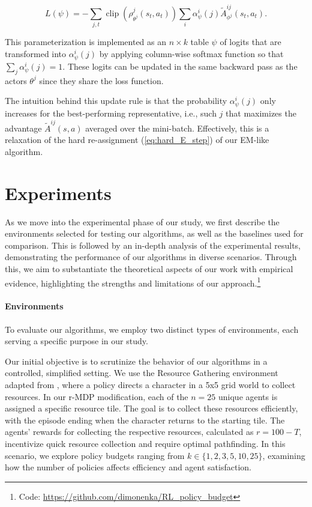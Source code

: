\documentclass[letterpaper]{article} %
\DeclareMathOperator*{\clip}{clip}
\begin{document}
\begin{equation}\label{eq:soft_loss}
    L(\psi) = - \sum_{j, t} \clip(\rho_{\theta^j}^j(s_t, a_t)) \sum_i \alpha_{\psi}^i(j) \tilde{A}_{\phi^j}^{ij}(s_t, a_t).
\end{equation}

This parameterization is implemented as an $n \times k$ table $\psi$ of logits that are transformed into $\alpha_\psi^i(j)$ by applying column-wise softmax function so that $\sum_j \alpha_\psi^i(j) = 1$. These logits can be updated in the same backward pass as the actors $\theta^j$ since they share the loss function.

The intuition behind this update rule is that the probability $\alpha_\psi^i(j)$ only increases for the best-performing representative, i.e., such $j$ that maximizes the advantage $\tilde{A}^{ij}(s, a)$ averaged over the mini-batch. Effectively, this is a relaxation of the hard re-assignment (\ref{eq:hard_E_step}) of our EM-like algorithm.


\section{Experiments}
\label{sec:experiments}

As we move into the experimental phase of our study, we first describe the environments selected for testing our algorithms, as well as the baselines used for comparison. This is followed by an in-depth analysis of the experimental results, demonstrating the performance of our algorithms in diverse scenarios. Through this, we aim to substantiate the theoretical aspects of our work with empirical evidence, highlighting the strengths and limitations of our approach.\footnote{Code: \url{https://github.com/dimonenka/RL_policy_budget}}


\paragraph{Environments}

To evaluate our algorithms, we employ two distinct types of environments, each serving a specific purpose in our study.

Our initial objective is to scrutinize the behavior of our algorithms in a controlled, simplified setting. We use the Resource Gathering environment adapted from \cite{barrett2008learning,Alegre+2022bnaic}, where a policy directs a character in a 5x5 grid world to collect resources. In our r-MDP modification, each of the $n=25$ unique agents is assigned a specific resource tile. The goal is to collect these resources efficiently, with the episode ending when the character returns to the starting tile. The agents’ rewards for collecting the respective resources, calculated as $r = 100 - T$, incentivize quick resource collection and require optimal pathfinding. In this scenario, we explore policy budgets ranging from $k \in \{1,2,3,5,10,25\}$, examining how the number of policies affects efficiency and agent satisfaction.
\end{document}
